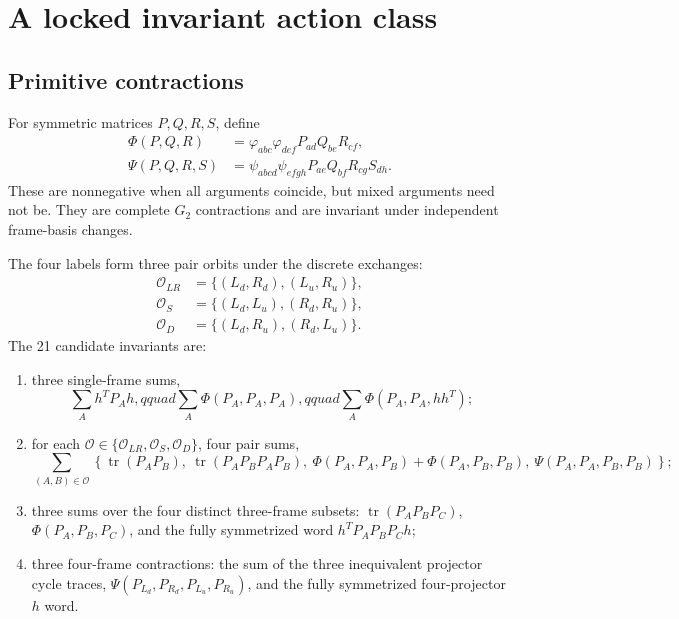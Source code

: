 \documentclass[11pt]{article}
\newcommand{\tr}{\operatorname{tr}}
\begin{document}
\section{A locked invariant action class}

\subsection{Primitive contractions}

For symmetric matrices $P,Q,R,S$, define
\begin{align}
  \Phi(P,Q,R)
  &=\varphi_{abc}\varphi_{def}P_{ad}Q_{be}R_{cf},
  \label{eq:PhiProj}\\
  \Psi(P,Q,R,S)
  &=\psi_{abcd}\psi_{efgh}P_{ae}Q_{bf}R_{cg}S_{dh}.
  \label{eq:PsiProj}
\end{align}
These are nonnegative when all arguments coincide, but mixed arguments need not be.  They are complete $G_2$ contractions and are invariant under independent frame-basis changes.

The four labels form three pair orbits under the discrete exchanges:
\begin{align}
  \mathcal O_{LR}&=\{(L_d,R_d),(L_u,R_u)\},\\
  \mathcal O_{S}&=\{(L_d,L_u),(R_d,R_u)\},\\
  \mathcal O_{D}&=\{(L_d,R_u),(R_d,L_u)\}.
\end{align}
The 21 candidate invariants are:
\begin{enumerate}[label=\arabic*.,leftmargin=2.2em]
  \item three single-frame sums,
  \begin{equation}
    \sum_A h^TP_Ah,qquad
    \sum_A\Phi(P_A,P_A,P_A),qquad
    \sum_A\Phi(P_A,P_A,hh^T);
  \end{equation}
  \item for each $\mathcal O\in\{\mathcal O_{LR},\mathcal O_S,\mathcal O_D\}$, four pair sums,
  \begin{equation}
  \sum_{(A,B)\in\mathcal O}
  \left\{
  \tr(P_AP_B),\ \tr(P_AP_BP_AP_B),\
  \Phi(P_A,P_A,P_B)+\Phi(P_A,P_B,P_B),\
  \Psi(P_A,P_A,P_B,P_B)
  \right\};
  \end{equation}
  \item three sums over the four distinct three-frame subsets: $\tr(P_AP_BP_C)$, $\Phi(P_A,P_B,P_C)$, and the fully symmetrized word $h^TP_AP_BP_Ch$;
  \item three four-frame contractions: the sum of the three inequivalent projector cycle traces, $\Psi(P_{L_d},P_{R_d},P_{L_u},P_{R_u})$, and the fully symmetrized four-projector $h$ word.
\end{enumerate}
\end{document}
